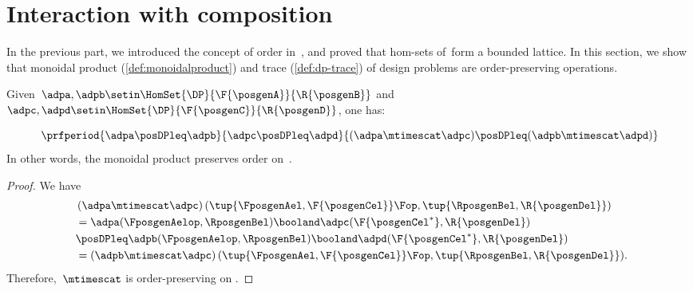 
\section{Interaction with composition}
In the previous part, we introduced the concept of order in~\DP, and proved that hom-sets of~\DP form a bounded lattice.
In this section, we show that monoidal product (\cref{def:monoidalproduct}) and trace (\cref{def:dp-trace}) of design problems are order-preserving operations.


\begin{lemma}
    \label{lem:tens_pres_order}
    Given~$\adpa,\adpb \setin \HomSet{\DP}{\F{\posgenA}}{\R{\posgenB}}$ and~$\adpc,\adpd \setin \HomSet{\DP}{\F{\posgenC}}{\R{\posgenD}}$, one has:

    \begin{equation}
        \prfperiod{
            \adpa\posDPleq \adpb
        }{
            \adpc\posDPleq \adpd
        }{
            (\adpa\mtimescat \adpc )\posDPleq (\adpb\mtimescat \adpd)
        }
    \end{equation}
    In other words, the monoidal product preserves order on~\DP.
\end{lemma}

\begin{proof}
    We have
    \begin{equation}
        \label{eq:tens_pres_ord}
        \begin{aligned}
            ~ & \left( \adpa\mtimescat \adpc\right) (\tup{\FposgenAel,\F{\posgenCel}}\Fop,\tup{\RposgenBel,\R{\posgenDel}}) \\
              & = \adpa(\FposgenAelop,\RposgenBel)\booland \adpc(\F{\posgenCel^*},\R{\posgenDel}) \\
              & \posDPleq \adpb(\FposgenAelop,\RposgenBel)\booland \adpd(\F{\posgenCel^*},\R{\posgenDel}) \\
              & =\left( \adpb\mtimescat \adpc\right) (\tup{\FposgenAel,\F{\posgenCel}}\Fop,\tup{\RposgenBel,\R{\posgenDel}}).
        \end{aligned}
    \end{equation}
    Therefore,~$\mtimescat$ is order-preserving on \DP.
\end{proof}

